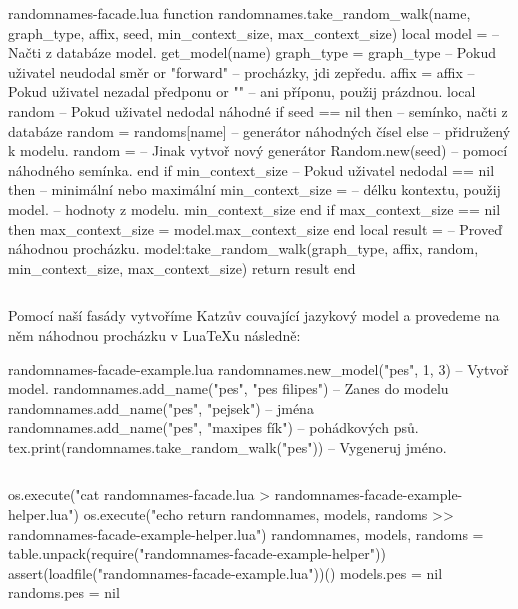 \documentclass{csbulletin}
\newcommand\myinputminted[3][]{%
  \inputminted[#1]{#2}{#3}%
}
\newcommand\myinputminted[3][]{%
  \inputminted[#1]{#2}{code-placeholder.#2}%
}
\begin{document}
\begin{filecontents}{randomnames-facade.lua}
function randomnames.take_random_walk(name, graph_type,
                                      affix, seed,
                                      min_context_size,
                                      max_context_size)
  local model =             -- Načti z databáze model.
    get_model(name)
  graph_type = graph_type   -- Pokud uživatel neudodal směr
            or "forward"    -- procházky, jdi zepředu.
  affix = affix             -- Pokud uživatel nezadal předponu
        or ""               -- ani příponu, použij prázdnou.
  local random              -- Pokud uživatel nedodal náhodné
  if seed == nil then       -- semínko, načti z databáze
    random = randoms[name]  -- generátor náhodných čísel
  else                      -- přidružený k modelu.
    random =                -- Jinak vytvoř nový generátor
      Random.new(seed)      -- pomocí náhodného semínka.
  end
  if min_context_size       -- Pokud uživatel nedodal
       == nil then          -- minimální nebo maximální
     min_context_size =     -- délku kontextu, použij
       model.               -- hodnoty z modelu.
         min_context_size
  end
  if max_context_size == nil then
     max_context_size = model.max_context_size
  end
  local result =            -- Proveď náhodnou procházku.
    model:take_random_walk(graph_type, affix, random,
                           min_context_size,
                           max_context_size)
  return result
end
\end{filecontents}
\myinputminted{lua}{randomnames-facade.lua}

Pomocí naší fasády vytvoříme Katzův couvající jazykový model a provedeme na něm náhodnou procházku v Lua\TeX u následně:

\begin{filecontents}{randomnames-facade-example.lua}
randomnames.new_model("pes", 1, 3)              -- Vytvoř model.
randomnames.add_name("pes", "pes filipes")      -- Zanes do modelu
randomnames.add_name("pes", "pejsek")           -- jména
randomnames.add_name("pes", "maxipes fík")      -- pohádkových psů.
tex.print(randomnames.take_random_walk("pes"))  -- Vygeneruj jméno.
\end{filecontents}
\myinputminted[linenos=false]{lua}{randomnames-facade-example.lua}

\noindent
\begin{luacode*}
os.execute("cat randomnames-facade.lua > randomnames-facade-example-helper.lua")
os.execute("echo return {randomnames, models, randoms} >> randomnames-facade-example-helper.lua")
randomnames, models, randoms = table.unpack(require("randomnames-facade-example-helper"))
assert(loadfile("randomnames-facade-example.lua"))()
models.pes = nil
randoms.pes = nil
\end{luacode*}
\end{document}
